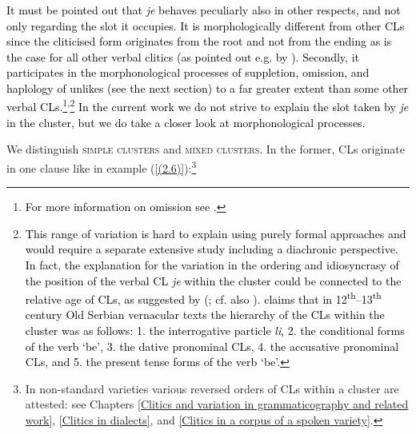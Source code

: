 \textcolor{black}{It must be pointed out that \textit{je} behaves peculiarly also in other respects, and not only regarding the slot it occupies. It is morphologically different from other CLs since the cliticised form originates from the root and not from the ending as is the case for all other verbal clitics (as pointed out e.g. by \citealt{MiseskaTomic96}). Secondly, it participates in the morphonological processes of suppletion, omission, and haplology of unlikes (see the next section) to a far greater extent than some other verbal CLs.\footnote{\textcolor{black}{For more information on omission see \citet{MeermannSonnenhauser16}.}}\textsuperscript{,}\footnote{\textcolor{black}{This range of variation is hard to explain using purely formal approaches and would require a separate extensive study including a diachronic perspective. In fact, the explanation for the variation in the ordering and idiosyncrasy of the position of the verbal CL \textit{je} within the cluster could be connected to the relative age of CLs, as suggested by \citeauthor{Grickat72} (\citeyear[95]{Grickat72}; cf. also \citealt[189]{ZimmerlingKosta13}). \citet[60]{Pavlovic13} claims that in 12\textsuperscript{th}--13\textsuperscript{th} century Old Serbian vernacular texts the hierarchy of the CLs within the cluster was as follows: 1. the interrogative particle \textit{li}, 2. the conditional forms of the verb ‘be’, 3. the dative pronominal CLs, 4. the accusative pronominal CLs, and 5. the present tense forms of the verb ‘be’.}} In the current work we do not strive to explain the slot taken by \textit{je} in the cluster, but we do take a closer look at morphonological processes.}




We distinguish \textsc{simple} \textsc{clusters} and \textsc{mixed} \textsc{clusters}. In the former, CLs originate in one clause like in example (\ref{(2.6)}):\footnote{In non-standard varieties various reversed orders of CLs within a cluster are attested: see Chapters \ref{Clitics and variation in grammaticography and related work}, \ref{Clitics in dialects}, and \ref{Clitics in a corpus of a spoken variety}.}


